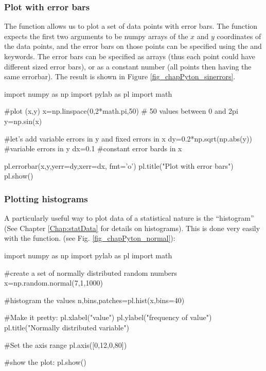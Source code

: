\subsubsection{Plot with error bars}
The  function allows us to plot a set of data points with error bars. The function expects the first two arguments to be numpy arrays of the $x$ and $y$ coordinates of the data points, and the error bars on those points can be specified using the  and  keywords. The error bars can be specified as arrays (thus each point could have different sized error bars), or as a constant number (all points then having the same errorbar). The result is shown in Figure \ref{fig_chapPyton_sinerrors}.

\begin{python}[caption = \mbox{}]
import numpy as np
import pylab as pl
import math 

#plot (x,y) 
x=np.linspace(0,2*math.pi,50) # 50 values between 0 and 2pi
y=np.sin(x)

#let's add variable errors in y and fixed errors in x
dy=0.2*np.sqrt(np.abs(y)) #variable errors in y
dx=0.1 #constant error bards in x

pl.errorbar(x,y,yerr=dy,xerr=dx, fmt='o') 
pl.title("Plot with error bars")
pl.show()

\end{python} 

\subsubsection{Plotting histograms}
\label{subsub:pythonhist}
A particularly useful way to plot data of a statistical nature is the ``histogram'' (See Chapter \ref{Chap:statData} for details on histograms). This is done very easily with the  function. (see Fig. \ref{fig_chapPyton_normal}):

\begin{python}[caption = \mbox{}]
import numpy as np
import pylab as pl
import math 

#create a set of normally distributed random numbers
x=np.random.normal(7,1,1000)

#histogram the values
n,bins,patches=pl.hist(x,bins=40)

#Make it pretty:
pl.xlabel("value")
pl.ylabel("frequency of value")
pl.title("Normally distributed variable")

#Set the axis range
pl.axis([0,12,0,80])

#show the plot:
pl.show()

\end{python} 

